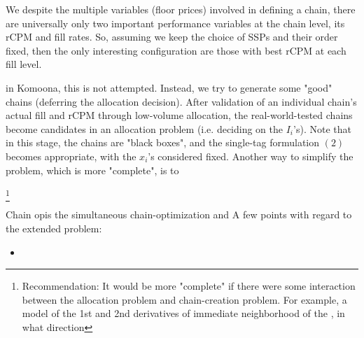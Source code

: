 \documentclass{article}
\begin{document}
\begin{large}
We despite the multiple variables (floor prices) involved in defining a chain, there are universally only two important performance variables at the chain level, its rCPM and fill rates. So, assuming we keep the choice of SSPs and their order fixed, then the only interesting configuration are those with best rCPM at each fill level.

in Komoona, this is not attempted. Instead, we try to generate some "good" chains (deferring the allocation decision). After validation of an individual chain's actual fill and rCPM through low-volume allocation, the real-world-tested chains become candidates in an allocation problem (i.e. deciding on the $I_i$'s). Note that in this stage, the chains are "black boxes", and the single-tag formulation $(2)$ becomes appropriate, with the $x_i$'s considered fixed. Another way to simplify the problem, which is more "complete", is to 

\footnote{Recommendation: It would be more "complete" if there were some interaction between the allocation problem and chain-creation problem. For example, a model of the 1st and 2nd derivatives of immediate neighborhood of the , in what direction }

Chain opis the simultaneous chain-optimization and 
A few points with regard to the extended problem:
\begin{itemize}
\item 
\end{itemize}
\fi

\end{large}
\end{document}
